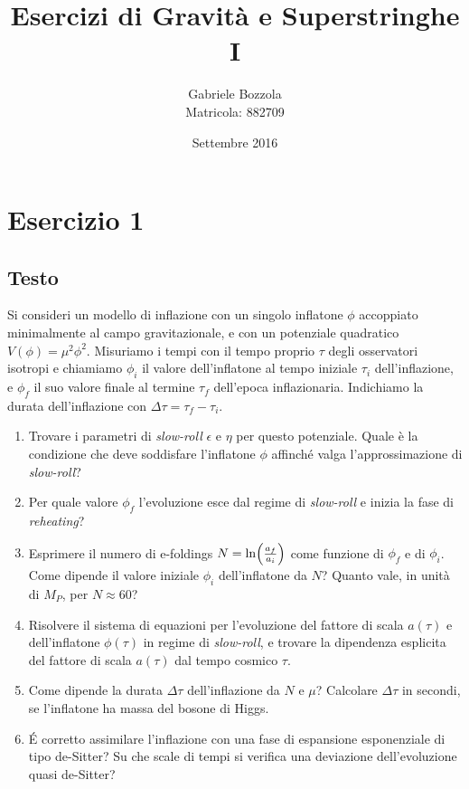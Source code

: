 \documentclass[]{scrartcl}
\title{Esercizi di Gravità e Superstringhe I}
\author{Gabriele Bozzola \\ Matricola: 882709}
\date{Settembre 2016}
\begin{document}
\maketitle

\section*{Esercizio 1}

\subsection*{Testo}

Si consideri un modello di inflazione con un singolo inflatone $ \phi $ accoppiato
minimalmente al campo gravitazionale, e con un potenziale quadratico $ V(\phi) = \mu^2 \phi^2 $.
Misuriamo i tempi con il tempo proprio $ \tau $ degli osservatori isotropi e chiamiamo $ \phi_i $
il valore dell'inflatone al tempo iniziale $ \tau_i $ dell'inflazione, e $ \phi_f $ il suo valore
finale al termine $ \tau_f $ dell'epoca inflazionaria.
Indichiamo la durata dell'inflazione con $ \Delta \tau = \tau_f - \tau_i $.
\begin{enumerate}
\item Trovare i parametri di \emph{slow-roll} $ \epsilon $ e $ \eta $ per questo potenziale.
  Quale è la condizione che deve soddisfare l'inflatone $ \phi $ affinché valga l'approssimazione
  di \emph{slow-roll}?
\item Per quale valore $ \phi_f $ l'evoluzione esce dal regime di \emph{slow-roll} e inizia la fase
  di \emph{reheating}?
\item Esprimere il numero di e-foldings $ N = \ln(a_f\over a_i) $ come funzione di $ \phi_f $ e di
  $ \phi_i $. Come dipende il valore iniziale $ \phi_i $ dell'inflatone da $ N $? Quanto vale,
  in unità di $ M_P $, per $ N \approx 60 $?
\item Risolvere il sistema di equazioni per l'evoluzione del fattore di scala $ a(\tau) $ e
  dell'inflatone $ \phi(\tau) $ in regime di \emph{slow-roll}, e trovare la dipendenza esplicita
  del fattore di scala $ a(\tau) $ dal tempo cosmico $ \tau $.
\item Come dipende la durata $ \Delta \tau $ dell'inflazione da $ N $ e $ \mu $? Calcolare $ \Delta\tau $
  in secondi, se l'inflatone ha massa del bosone di Higgs.
\item \'E corretto assimilare l'inflazione con una fase di espansione esponenziale di tipo de-Sitter?
  Su che scale di tempi si verifica una deviazione dell'evoluzione quasi de-Sitter?
\end{enumerate}
\end{document}
